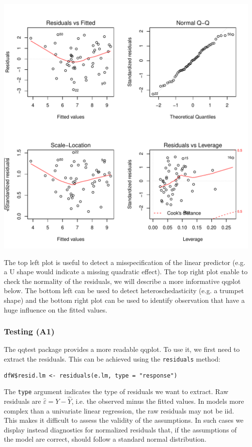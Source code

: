 \documentclass{article}
\begin{document}
\begin{center}
\includegraphics[width=.9\linewidth]{./figures/diag-lm.pdf}
\end{center}

The top left plot is useful to detect a misspecification of the linear
predictor (e.g. a U shape would indicate a missing quadratic
effect). The top right plot enable to check the normality of the
residuals, we will describe a more informative qqplot below. The
bottom left can be used to detect heteroschedasticity (e.g. a trumpet
shape) and the bottom right plot can be used to identify observation
that have a huge influence on the fitted values.

\subsubsection{Testing (A1)}
\label{sec:org0502a4f}

The qqtest package provides a more readable qqplot. To use it, we
first need to extract the residuals. This can be achieved using the
\texttt{residuals} method:
\lstset{language=r,label= ,caption= ,captionpos=b,numbers=none}
\begin{lstlisting}
dfW$resid.lm <- residuals(e.lm, type = "response")
\end{lstlisting}

The \texttt{type} argument indicates the type of residuals we want to
extract. Raw residuals are \(\hat{\varepsilon} = Y-\hat{Y}\), i.e. the
observed minus the fitted values. In models more complex than a
univariate linear regression, the raw residuals may not be iid. This
makes it difficult to assess the validity of the assumptions. In such
cases we display instead diagnostics for normalized residuals that, if
the assumptions of the model are correct, should follow a standard
normal distribution.
\end{document}
